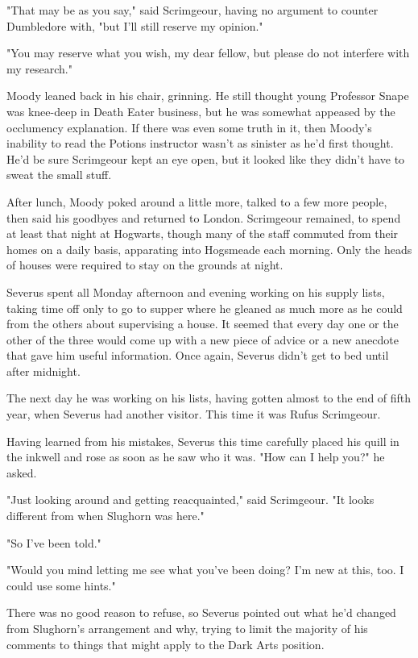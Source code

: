 "That may be as you say," said Scrimgeour, having no argument to counter Dumbledore with, "but I'll still reserve my opinion."

"You may reserve what you wish, my dear fellow, but please do not interfere with my research."

Moody leaned back in his chair, grinning. He still thought young Professor Snape was knee-deep in Death Eater business, but he was somewhat appeased by the occlumency explanation. If there was even some truth in it, then Moody's inability to read the Potions instructor wasn't as sinister as he'd first thought. He'd be sure Scrimgeour kept an eye open, but it looked like they didn't have to sweat the small stuff.

After lunch, Moody poked around a little more, talked to a few more people, then said his goodbyes and returned to London. Scrimgeour remained, to spend at least that night at Hogwarts, though many of the staff commuted from their homes on a daily basis, apparating into Hogsmeade each morning. Only the heads of houses were required to stay on the grounds at night.

Severus spent all Monday afternoon and evening working on his supply lists, taking time off only to go to supper where he gleaned as much more as he could from the others about supervising a house. It seemed that every day one or the other of the three would come up with a new piece of advice or a new anecdote that gave him useful information. Once again, Severus didn't get to bed until after midnight.

The next day he was working on his lists, having gotten almost to the end of fifth year, when Severus had another visitor. This time it was Rufus Scrimgeour.

Having learned from his mistakes, Severus this time carefully placed his quill in the inkwell and rose as soon as he saw who it was. "How can I help you?" he asked.

"Just looking around and getting reacquainted," said Scrimgeour. "It looks different from when Slughorn was here."

"So I've been told."

"Would you mind letting me see what you've been doing? I'm new at this, too. I could use some hints."

There was no good reason to refuse, so Severus pointed out what he'd changed from Slughorn's arrangement and why, trying to limit the majority of his comments to things that might apply to the Dark Arts position.

